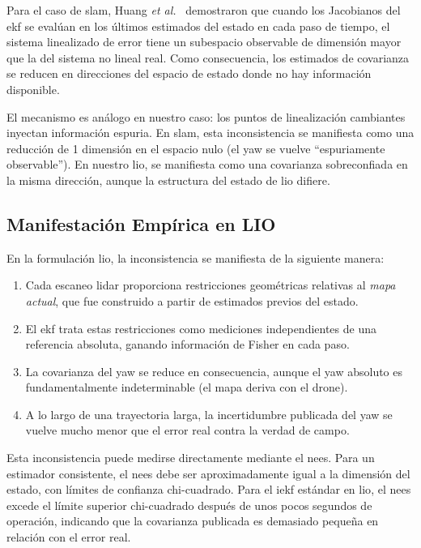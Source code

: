 Para el caso de \gls{slam}, Huang \emph{et al.}~\cite{huang2010observability}
demostraron que cuando los Jacobianos del \gls{ekf} se evalúan en los últimos
estimados del estado en cada paso de tiempo, el sistema linealizado de error
tiene un subespacio observable de dimensión mayor que la del sistema no lineal
real. Como consecuencia, los estimados de covarianza se reducen en direcciones
del espacio de estado donde no hay información disponible.

El mecanismo es análogo en nuestro caso: los puntos de linealización cambiantes
inyectan información espuria. En \gls{slam}, esta inconsistencia se manifiesta
como una reducción de 1 dimensión en el espacio nulo (el yaw se vuelve
``espuriamente observable''). En nuestro \gls{lio}, se manifiesta como una
covarianza sobreconfiada en la misma dirección, aunque la estructura del estado
de \gls{lio} difiere.

\subsection{Manifestación Empírica en LIO}
\label{sec:fej-manifestacion-empirica}

En la formulación \gls{lio}, la inconsistencia se manifiesta de la siguiente
manera:

\begin{enumerate}
    \item Cada escaneo \gls{lidar} proporciona restricciones geométricas
    relativas al \emph{mapa actual}, que fue construido a partir de estimados
    previos del estado.
    \item El \gls{ekf} trata estas restricciones como mediciones independientes
    de una referencia absoluta, ganando información de Fisher en cada paso.
    \item La covarianza del yaw se reduce en consecuencia, aunque el yaw
    absoluto es fundamentalmente indeterminable (el mapa deriva con el drone).
    \item A lo largo de una trayectoria larga, la incertidumbre publicada del
    yaw se vuelve mucho menor que el error real contra la verdad de campo.
\end{enumerate}

Esta inconsistencia puede medirse directamente mediante el \gls{nees}. Para un
estimador consistente, el \gls{nees} debe ser aproximadamente igual a la
dimensión del estado, con límites de confianza chi-cuadrado. Para el \gls{iekf}
estándar en \gls{lio}, el \gls{nees} excede el límite superior chi-cuadrado
después de unos pocos segundos de operación, indicando que la covarianza
publicada es demasiado pequeña en relación con el error real.

